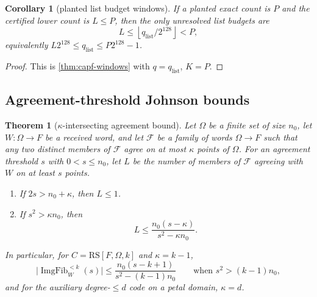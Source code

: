 \documentclass[11pt]{article}
\newtheorem{theorem}{Theorem}[section]
\newtheorem{corollary}[corollary]{Corollary}
\theoremstyle{definition}
\theoremstyle{remark}
\newcommand{\RS}{\mathrm{RS}}
\providecommand{\ImgFib}{\operatorname{ImgFib}}
\providecommand{\floor}[1]{\left\lfloor #1\right\rfloor}
\begin{document}
\begin{corollary}[planted list budget windows]\label{cor:capf-list-windows}
If a planted exact count is $P$ and the certified lower count is $L\le P$, then the only unresolved list budgets are
\[
        L\le \floor{q_{\mathrm{list}}/2^{128}}<P,
\]
equivalently $L2^{128}\le q_{\mathrm{list}}\le P2^{128}-1$.
\end{corollary}

\begin{proof}
This is \cref{thm:capf-windows} with $q=q_{\mathrm{list}}$, $K=P$.
\end{proof}

\subsection{Agreement-threshold Johnson bounds}

\begin{theorem}[$\kappa$-intersecting agreement bound]\label{thm:capf-johnson-list}
Let $\Omega$ be a finite set of size $n_0$, let $W:\Omega\to F$ be a received word, and let $\mathcal F$ be a family of words $\Omega\to F$ such that any two distinct members of $\mathcal F$ agree on at most $\kappa$ points of $\Omega$.  For an agreement threshold $s$ with $0<s\le n_0$, let $L$ be the number of members of $\mathcal F$ agreeing with $W$ on at least $s$ points.
\begin{enumerate}[label=\textup{(\roman*)}]
\item If $2s>n_0+\kappa$, then $L\le1$.
\item If $s^2>\kappa n_0$, then
\[
        L
        \le
        \frac{n_0(s-\kappa)}{s^2-\kappa n_0}.
\]
\end{enumerate}
In particular, for $C=\RS[F,\Omega,k]$ and $\kappa=k-1$,
\[
        \bigl|\ImgFib_W^{<k}(s)\bigr|\le\frac{n_0(s-k+1)}{s^2-(k-1)n_0}
        \qquad\text{when }s^2>(k-1)n_0,
\]
and for the auxiliary degree-$\le d$ code on a petal domain, $\kappa=d$.
\end{theorem}
\end{document}
